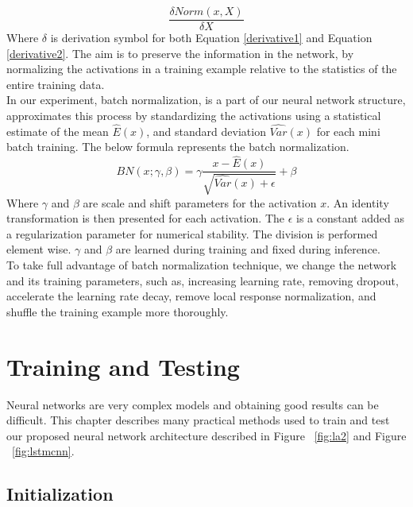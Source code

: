 \begin{equation}\label{derivative2}
    \frac{\delta Norm(x,X)}{\delta X}
\end{equation}
Where $\delta$ is derivation symbol for both Equation \ref{derivative1} and Equation \ref{derivative2}. 
The  aim is to preserve the information in the network, by
normalizing the activations in a training example relative
to the statistics of the entire training data.\\

In our experiment, batch normalization, is a part of our neural network structure, approximates this process by standardizing the activations using a statistical estimate of the mean $\widehat{E}(x)$, and standard deviation $\widehat{Var}(x)$  for each mini batch training. The below formula represents the batch normalization.
\begin{equation}
        BN\left ( x;\gamma ,\beta \right )=\gamma \frac{x-\widehat{E}(x)}{\sqrt{\widehat{Var}(x)+\epsilon }} +\beta
\end{equation}
Where $\gamma$ and $\beta$ are scale and shift parameters for the activation $x$. An identity transformation is then presented for each activation. The $\epsilon$ is a constant added as a regularization parameter for numerical stability. The division is performed element wise. $\gamma$ and $\beta$ are learned during training and fixed during inference.\\

To take full advantage of batch normalization technique, we change the network and its training parameters, such as, increasing learning rate, removing dropout, accelerate the learning rate decay, remove local response normalization, and shuffle the training example more thoroughly.

\section{Training and Testing}
Neural networks are very complex models and obtaining good results can be
difficult. This chapter describes many practical methods used to train and test our proposed neural network architecture described in Figure ~\ref{fig:la2} and Figure ~\ref{fig:lstmcnn}.

\subsection{Initialization}

